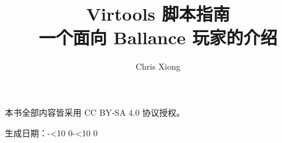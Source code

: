 \documentclass[oneside]{book}
\title{Virtools 脚本指南\\ \large 一个面向 Ballance 玩家的介绍}
\author{Chris Xiong}
\begin{document}
\begin{titlepage}
	\makeatletter
	\centering
	\vspace*{3cm}
	{\huge \@title \par}
	\vspace{1cm}
	{\@author}
	\vfill
	{本书全部内容皆采用 CC BY-SA 4.0 协议授权。\par}
	\def\padd#1{\ifnum #1<10 0\fi\the#1}
	{生成日期：\the\year-\padd\month-\padd\day}
	\vfill
\end{titlepage}
\renewcommand{\contentsname}{目录}
\tableofcontents





\end{document}
